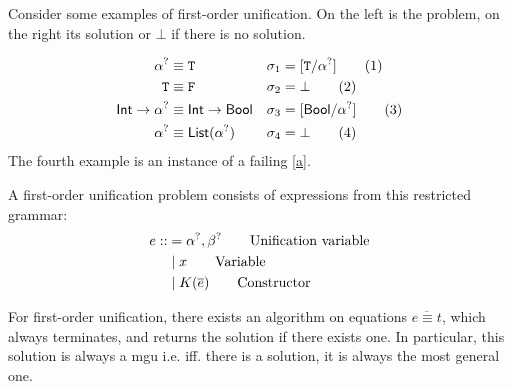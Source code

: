 \documentclass[twoside,12pt,a4paper]{article}
\begin{document}
Consider some examples of first-order unification. On the left is the problem, on the right its solution or $\bot$ if there is no solution.
\begin{example}
    \begin{align*}
        \alpha^? &\equiv \mathtt{T} &\sigma_1 &= [\mathtt{T}/\alpha^?]\tag{1}\\
        \mathtt{T} &\equiv \mathtt{F} &\sigma_2 &= \bot\tag{2}\\
        \mathsf{Int} \rightarrow \alpha^? &\equiv \mathsf{Int} \rightarrow \mathsf{Bool} &\sigma_3 &= [\mathsf{Bool}/\alpha^?]\tag{3}\\
        \alpha^?&\equiv \mathsf{List(\alpha^?)} &\sigma_4 &= \bot\tag{4}
    \end{align*}
    The fourth example is an instance of a failing \ref{a}.
\end{example}

\begin{definition}
    A first-order unification problem consists of expressions from this restricted grammar:
\begin{align*}
    e ::&= \alpha^?, \beta^? \tag*{Unification variable}\\
    &\;|\; x\tag*{Variable} \\
    &\;|\; K(\overline{e}) \tag*{Constructor}
\end{align*}
\end{definition}

\begin{theorem}
    For first-order unification, there exists an algorithm on equations $\overline{e\equiv t}$, which always terminates, and returns the solution if there exists one. 
    In particular, this solution is always a mgu i.e. iff. there is a solution, it is always the most general one.\cite{10.1145/321250.321253}
\end{theorem}
\end{document}
